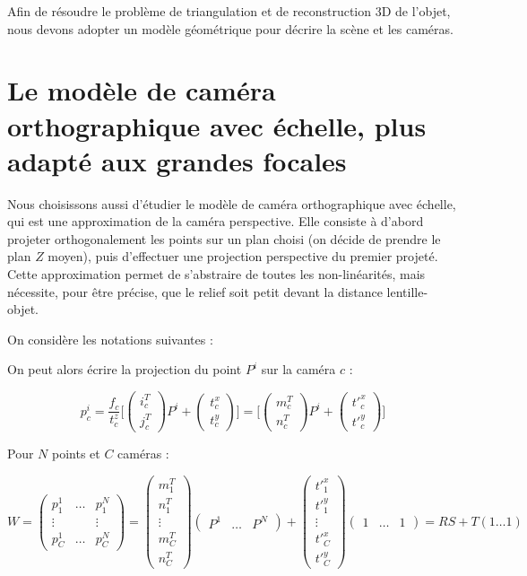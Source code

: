 \documentclass[11pt]{report}
\begin{document}
Afin de résoudre le problème de triangulation et de reconstruction 3D de l'objet, nous devons adopter un modèle géométrique pour décrire la scène et les caméras.

\section{Le modèle de caméra orthographique avec échelle, plus adapté aux grandes focales}

Nous choisissons aussi d'étudier le modèle de caméra orthographique avec échelle, qui est une approximation de la caméra perspective. Elle consiste à d'abord projeter orthogonalement les points sur un plan choisi (on décide de prendre le plan $Z$ moyen), puis d'effectuer une projection perspective du premier projeté. Cette approximation permet de s'abstraire de toutes les non-linéarités, mais nécessite, pour être précise, que le relief soit petit devant la distance lentille-objet. \cite{poelman1993paraperspective}

On considère les notations suivantes :

On peut alors écrire la projection du point $P^i$ sur la caméra $c$ :

$$ p_c^i = \frac{f_c}{t_c^z} \big[ \begin{pmatrix} i_c^T \\ j_c^T \end{pmatrix} P^i + \begin{pmatrix} t_c^x \\ t_c^y \end{pmatrix} \big] = \big[ \begin{pmatrix} m_c^T \\ n_c^T \end{pmatrix} P^i + \begin{pmatrix} {t'}_c^x \\ {t'}_c^y \end{pmatrix} \big]  $$

Pour $N$ points et $C$ caméras :

$$
W =
\begin{pmatrix}
p_1^1 & \dots & p_1^N \\ \vdots & & \vdots \\ p_C^1 & \dots & p_C^N
\end{pmatrix}
=
\begin{pmatrix}
m_1^T \\ n_1^T \\ \vdots \\ m_C^T \\ n_C^T
\end{pmatrix}
\begin{pmatrix}
P^1 & \dots & P^N
\end{pmatrix}
+
\begin{pmatrix}
{t'}_1^x \\ {t'}_1^y \\ \vdots \\ {t'}_C^x \\ {t'}_C^y
\end{pmatrix}
\begin{pmatrix}
1 & \dots & 1
\end{pmatrix}
=RS + T (1 \dots 1)
$$
\end{document}
